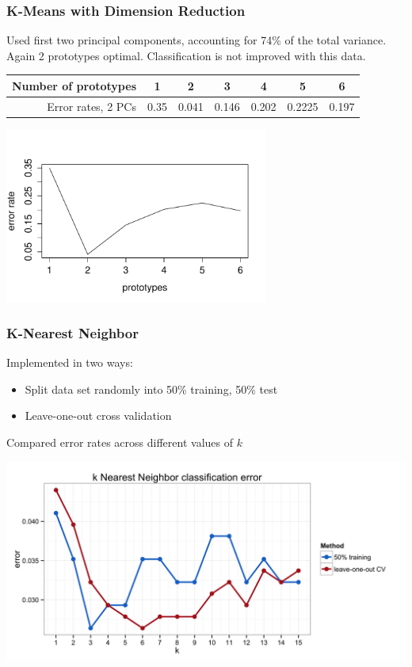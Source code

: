 \documentclass[10pt]{beamer}
\begin{document}
\begin{frame}\frametitle{K-Means with Dimension Reduction}
    Used first two principal components, accounting for 74\% of the total variance. Again 2 prototypes optimal. Classification is not improved with this data.

    \begin{center}
    \begin{tabular}{rcccccc}
        \toprule
        Number of prototypes & 1 & 2 & 3 & 4 & 5 & 6 \\
        \midrule
        Error rates, 2 PCs & 0.35 & 0.041 & 0.146 & 0.202 & 0.2225 & 0.197 \\
        \bottomrule
    \end{tabular}

    \includegraphics[width=0.65\textwidth]{7.pdf}
    \end{center}
\end{frame}

\begin{frame}\frametitle{K-Nearest Neighbor}
    Implemented in two ways:
    \begin{itemize}
        \item Split data set randomly into 50\% training, 50\% test
        \item Leave-one-out cross validation
    \end{itemize}

    Compared error rates across different values of $k$

    \begin{center}
        \includegraphics[width=\textwidth]{knn1.png}
    \end{center}
\end{frame}
\end{document}
